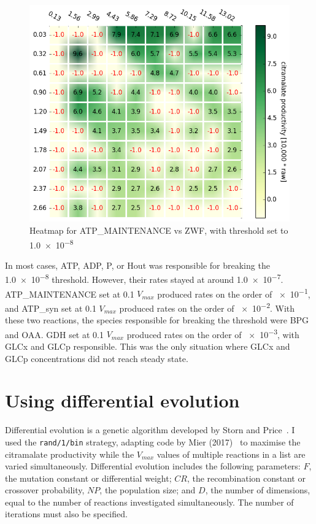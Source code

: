 \documentclass[parskip=full]{scrreprt}
\begin{document}
\begin{figure}[htbp]
  \centering
  \includegraphics[scale=0.5]{steadystate}
  \caption{Heatmap for ATP\_MAINTENANCE vs ZWF, with threshold set to \num{1.0e-8}}
  \label{fig:steadystate}
\end{figure}

In most cases, ATP, ADP, P, or Hout was responsible for breaking the \num{1.0e-8} threshold. However, their rates stayed at around \num{1.0e-7}. ATP\_MAINTENANCE set at 0.1 $V_{max}$ produced rates on the order of \num{e-1}, and ATP\_syn set at 0.1 $V_{max}$ produced rates on the order of \num{e-2}. With these two reactions, the species responsible for breaking the threshold were BPG and OAA. GDH set at 0.1 $V_{max}$ produced rates on the order of \num{e-3}, with GLCx and GLCp responsible. This was the only situation where GLCx and GLCp concentrations did not reach steady state.

\section{Using differential evolution}
\label{sec:de}

Differential evolution is a genetic algorithm developed by Storn and Price~\cite{storn_differential_1997}. I used the \texttt{rand/1/bin} strategy, adapting code by Mier (2017)~\cite{mier_tutorial_2017, mier_small_2017} to maximise the citramalate productivity while the $V_{max}$ values of multiple reactions in a list are varied simultaneously. Differential evolution includes the following parameters: $F$, the mutation constant or differential weight; $CR$, the recombination constant or crossover probability, $NP$, the population size; and $D$, the number of dimensions, equal to the number of reactions investigated simultaneously. The number of iterations must also be specified.
\end{document}
